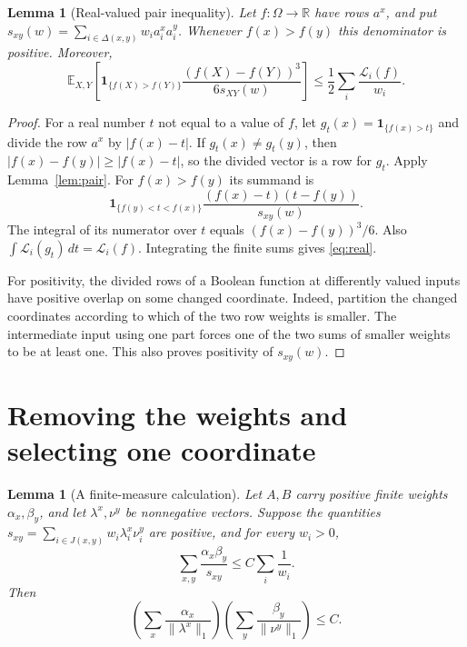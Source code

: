\documentclass[11pt,reqno]{amsart}
\newtheorem{lemma}[theorem]{Lemma}
\theoremstyle{definition}
\theoremstyle{remark}
\newcommand{\E}{\mathbb E}
\newcommand{\R}{\mathbb R}
\newcommand{\one}{\mathbf 1}
\newcommand{\cL}{\mathcal L}
\newcommand{\norm}[1]{\lVert #1\rVert_1}
\numberwithin{equation}{section}
\begin{document}
\begin{lemma}[Real-valued pair inequality]\label{lem:real}
Let $f\colon\Omega\to\R$ have rows $a^x$, and put
$s_{xy}(w)=\sum_{i\in\Delta(x,y)}w_i a_i^x a_i^y$.
Whenever $f(x)>f(y)$ this denominator is positive. Moreover,
\begin{equation}\label{eq:real}
 \E_{X,Y}\left[\one_{\{f(X)>f(Y)\}}
 \frac{(f(X)-f(Y))^3}{6s_{XY}(w)}\right]
 \le\frac12\sum_i\frac{\cL_i(f)}{w_i}.
\end{equation}
\end{lemma}

\begin{proof}
For a real number $t$ not equal to a value of $f$, let
$g_t(x)=\one_{\{f(x)>t\}}$ and divide the row $a^x$ by $|f(x)-t|$.
If $g_t(x)\ne g_t(y)$, then $|f(x)-f(y)|\ge|f(x)-t|$, so the divided
vector is a row for $g_t$.
Apply Lemma~\ref{lem:pair}. For $f(x)>f(y)$ its summand is
\[
 \one_{\{f(y)<t<f(x)\}}
 \frac{(f(x)-t)(t-f(y))}{s_{xy}(w)}.
\]
The integral of its numerator over $t$ equals $(f(x)-f(y))^3/6$.
Also $\int\cL_i(g_t)\,dt=\cL_i(f)$. Integrating the finite sums gives
\eqref{eq:real}.

For positivity, the divided rows of a Boolean function at differently
valued inputs have positive overlap on some changed coordinate. Indeed,
partition the changed coordinates according to which of the two row
weights is smaller. The intermediate input using one part forces one
of the two sums of smaller weights to be at least one. This also proves
positivity of $s_{xy}(w)$.
\end{proof}

\section{Removing the weights and selecting one coordinate}

\begin{lemma}[A finite-measure calculation]\label{lem:weights}
Let $A,B$ carry positive finite weights $\alpha_x,\beta_y$, and let
$\lambda^x,\nu^y$ be nonnegative vectors. Suppose the quantities
$s_{xy}=\sum_{i\in J(x,y)}w_i\lambda_i^x\nu_i^y$ are positive, and for
every $w_i>0$,
\[
 \sum_{x,y}\frac{\alpha_x\beta_y}{s_{xy}}
 \le C\sum_i\frac1{w_i}.
\]
Then
\begin{equation}\label{eq:remove}
 \left(\sum_x\frac{\alpha_x}{\norm{\lambda^x}}\right)
 \left(\sum_y\frac{\beta_y}{\norm{\nu^y}}\right)\le C.
\end{equation}
\end{lemma}
\end{document}

